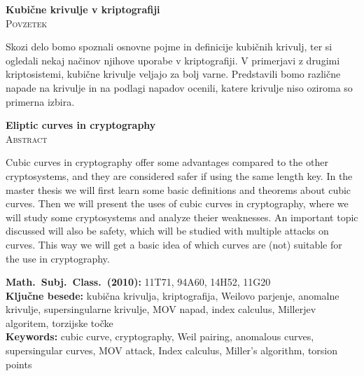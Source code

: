 \documentclass[12pt,a4paper,twoside]{article}
\newcommand{\naslovdela}{Kubične krivulje v kriptografiji}
\newcommand{\kljucnebesede}{kubična krivulja\sep kriptografija\sep Weilovo parjenje\sep anomalne krivulje\sep supersingularne krivulje\sep MOV napad\sep index calculus\sep Millerjev algoritem\sep torzijske točke} %
\newcommand{\keywords}{cubic curve\sep cryptography\sep Weil pairing\sep anomalous curves\sep supersingular curves\sep MOV attack\sep Index calculus\sep Miller's algorithm\sep torsion points} %
\newcommand{\sep}{, }  %
\theoremstyle{definition} %
\theoremstyle{plain} %
\numberwithin{equation}{section}  %
\begin{document}

\cleardoublepage
{}

\begin{center}
\textbf{\naslovdela} \\[3mm]
\textsc{Povzetek} \\[2mm]
\end{center}
Skozi delo bomo spoznali osnovne pojme in definicije kubičnih krivulj, ter si ogledali nekaj načinov njihove uporabe v kriptografiji. V primerjavi z drugimi kriptosistemi, kubične krivulje veljajo za bolj varne. Predstavili bomo različne napade na krivulje in na podlagi napadov ocenili, katere krivulje niso oziroma so primerna izbira.

\vfill
\begin{center}
\textbf{Eliptic curves in cryptography} \\[3mm] %
\textsc{Abstract}\\[2mm]
\end{center}

Cubic curves in cryptography offer some advantages compared to the other cryptosystems, and they are considered safer if using the same length key. In the master thesis we will first learn some basic definitions and theorems about cubic curves. Then we will present the uses of cubic curves in cryptography, where we will study some cryptosystems and analyze theier weaknesses. An important topic discussed will also be safety, which will be studied with multiple attacks on curves. This way we will get a basic idea of which curves are (not) suitable for the use in cryptography.


\vfill\noindent
\textbf{Math.~Subj.~Class.~(2010):}	11T71, 94A60, 14H52, 11G20  \\[1mm]
\textbf{Ključne besede:} \kljucnebesede \\[1mm]
\textbf{Keywords:} \keywords

\cleardoublepage

\setcounter{page}{1}    %



\end{document}
